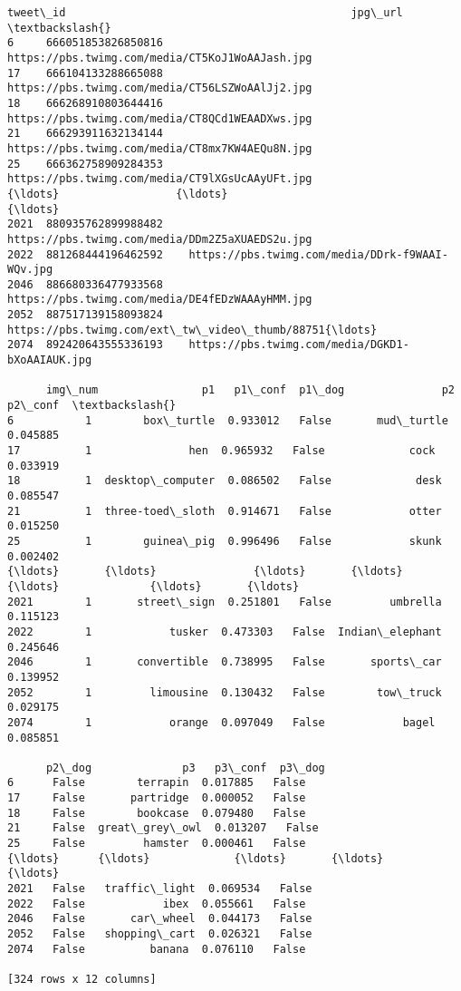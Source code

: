 \documentclass[11pt]{article}
\makeatletter
\newcommand{\boxspacing}{\kern\kvtcb@left@rule\kern\kvtcb@boxsep}
\newcommand{\prompt}[4]{
        {\ttfamily\llap{{\color{#2}[#3]:\hspace{3pt}#4}}\vspace{-\baselineskip}}
    }
\makeatother
\begin{document}
            \begin{tcolorbox}[breakable, size=fbox, boxrule=.5pt, pad at break*=1mm, opacityfill=0]
\prompt{Out}{outcolor}{29}{\boxspacing}
\begin{Verbatim}[commandchars=\\\{\}]
                tweet\_id                                            jpg\_url  \textbackslash{}
6     666051853826850816    https://pbs.twimg.com/media/CT5KoJ1WoAAJash.jpg
17    666104133288665088    https://pbs.twimg.com/media/CT56LSZWoAAlJj2.jpg
18    666268910803644416    https://pbs.twimg.com/media/CT8QCd1WEAADXws.jpg
21    666293911632134144    https://pbs.twimg.com/media/CT8mx7KW4AEQu8N.jpg
25    666362758909284353    https://pbs.twimg.com/media/CT9lXGsUcAAyUFt.jpg
{\ldots}                  {\ldots}                                                {\ldots}
2021  880935762899988482    https://pbs.twimg.com/media/DDm2Z5aXUAEDS2u.jpg
2022  881268444196462592    https://pbs.twimg.com/media/DDrk-f9WAAI-WQv.jpg
2046  886680336477933568    https://pbs.twimg.com/media/DE4fEDzWAAAyHMM.jpg
2052  887517139158093824  https://pbs.twimg.com/ext\_tw\_video\_thumb/88751{\ldots}
2074  892420643555336193    https://pbs.twimg.com/media/DGKD1-bXoAAIAUK.jpg

      img\_num                p1   p1\_conf  p1\_dog               p2   p2\_conf  \textbackslash{}
6           1        box\_turtle  0.933012   False       mud\_turtle  0.045885
17          1               hen  0.965932   False             cock  0.033919
18          1  desktop\_computer  0.086502   False             desk  0.085547
21          1  three-toed\_sloth  0.914671   False            otter  0.015250
25          1        guinea\_pig  0.996496   False            skunk  0.002402
{\ldots}       {\ldots}               {\ldots}       {\ldots}     {\ldots}              {\ldots}       {\ldots}
2021        1       street\_sign  0.251801   False         umbrella  0.115123
2022        1            tusker  0.473303   False  Indian\_elephant  0.245646
2046        1       convertible  0.738995   False       sports\_car  0.139952
2052        1         limousine  0.130432   False        tow\_truck  0.029175
2074        1            orange  0.097049   False            bagel  0.085851

      p2\_dog              p3   p3\_conf  p3\_dog
6      False        terrapin  0.017885   False
17     False       partridge  0.000052   False
18     False        bookcase  0.079480   False
21     False  great\_grey\_owl  0.013207   False
25     False         hamster  0.000461   False
{\ldots}      {\ldots}             {\ldots}       {\ldots}     {\ldots}
2021   False   traffic\_light  0.069534   False
2022   False            ibex  0.055661   False
2046   False       car\_wheel  0.044173   False
2052   False   shopping\_cart  0.026321   False
2074   False          banana  0.076110   False

[324 rows x 12 columns]
\end{Verbatim}
\end{tcolorbox}
        
\end{document}
